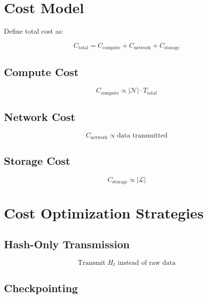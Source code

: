 \section{Cost Model}

Define total cost as:

\begin{equation}
C_{\text{total}} = C_{\text{compute}} + C_{\text{network}} + C_{\text{storage}}
\end{equation}

\subsection{Compute Cost}

\begin{equation}
C_{\text{compute}} \propto |\mathcal{N}| \cdot T_{\text{total}}
\end{equation}

\subsection{Network Cost}

\begin{equation}
C_{\text{network}} \propto \text{data transmitted}
\end{equation}

\subsection{Storage Cost}

\begin{equation}
C_{\text{storage}} \propto |\mathcal{L}|
\end{equation}

\section{Cost Optimization Strategies}

\subsection{Hash-Only Transmission}

\begin{equation}
\text{Transmit } H_t \text{ instead of raw data}
\end{equation}

\subsection{Checkpointing}

